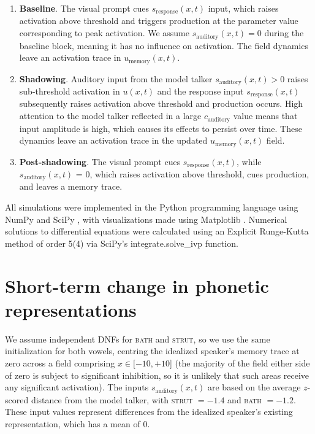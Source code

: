 \documentclass[10pt,letterpaper]{article}
\begin{document}
\begin{enumerate}
	\item \textbf{Baseline}. The visual prompt cues $s_{\text{response}}(x,t)$ input, which raises activation above threshold and triggers production at the parameter value corresponding to peak activation. We assume $s_{\text{auditory}}(x,t) = 0$ during the baseline block, meaning it has no influence on activation. The field dynamics leave an activation trace in $u_{\text{memory}}(x,t)$.
	\item \textbf{Shadowing}. Auditory input from the model talker $s_{\text{auditory}}(x,t) > 0$ raises sub-threshold activation in $u(x,t)$ and the response input $s_{\text{response}}(x,t)$ subsequently raises activation above threshold and production occurs. High attention to the model talker reflected in a large $c_{\text{auditory}}$ value means that input amplitude is high, which causes its effects to persist over time. These dynamics leave an activation trace in the updated $u_{\text{memory}}(x,t)$ field.
	\item \textbf{Post-shadowing}. The visual prompt cues $s_{\text{response}}(x,t)$, while $s_{\text{auditory}}(x,t)$ = 0, which raises activation above threshold, cues production, and leaves a memory trace.
\end{enumerate}

All simulations were implemented in the Python programming language using NumPy \citep{harris2020} and SciPy \citep{SciPy-NMeth2020}, with visualizations made using Matplotlib \citep{hunter2007}. Numerical solutions to differential equations were calculated using an Explicit Runge-Kutta method of order 5(4) via SciPy's integrate.solve\_ivp function.

\section{Short-term change in phonetic representations}
\label{sec:simulations}

We assume independent DNFs for \textsc{bath} and \textsc{strut}, so we use the same initialization for both vowels, centring the idealized speaker's memory trace at zero across a field comprising $x\in [-10, +10$] (the majority of the field either side of zero is subject to significant inhibition, so it is unlikely that such areas receive any significant activation). The inputs $s_{\text{auditory}}(x,t)$ are based on the average $z$-scored distance from the model talker, with \textsc{strut} $= -1.4$ and \textsc{bath} $= -1.2$. These input values represent differences from the idealized speaker's existing representation, which has a mean of 0.
\end{document}
